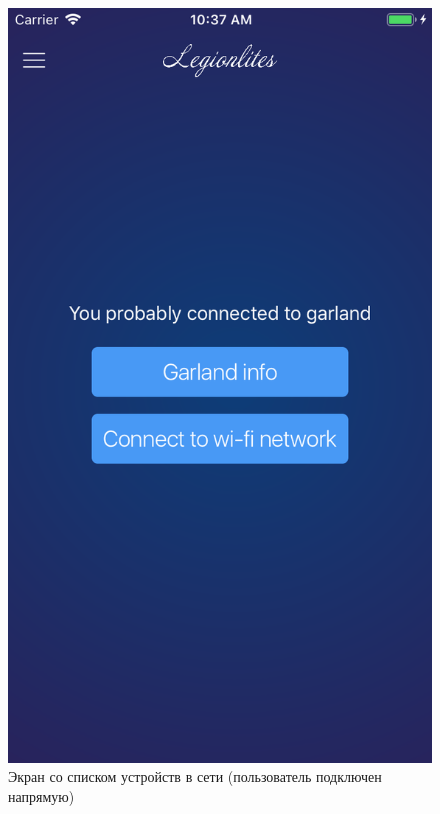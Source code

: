 ~
\begin{figure}[H]
\centering
	\includegraphics[scale=0.2]{figures/userGuide/device.png}
	\caption{Экран со списком устройств в сети (пользователь подключен напрямую)}
	\label{fig:develop:userGuide:device}
\end{figure}

